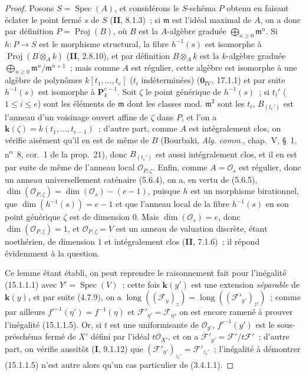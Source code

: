 \begin{proof}
Posons $S=\operatorname{Spec}(A)$, et considérons le $S$-schéma $P$ obtenu en
faisant éclater le point fermé $s$ de $S$ (\textbf{II}, 8.1.3)~; si $\mathfrak m$
est l'idéal maximal de $A$, on a donc par définition
$P=\operatorname{Proj}(B)$, où $B$ est la $A$-algèbre graduée
$\bigoplus_{n\geqslant0}\mathfrak m^n$. Si $h:P\to S$ est le morphisme
structural, la fibre $h^{-1}(s)$ est isomorphe à
$\operatorname{Proj}(B\otimes_A k)$ (\textbf{II}, 2.8.10), et par définition
$B\otimes_A k$ est la $k$-algèbre graduée
$\bigoplus_{n\geqslant0}\mathfrak m^n/\mathfrak m^{n+1}$~; mais comme $A$ est
régulier, cette algèbre est isomorphe à une algèbre de polynômes
$k[t_1,\ldots,t_e]$ ($t_i$ indéterminées) ($\mathbf{0}_{\mathrm{IV}}$, 17.1.1)
et par suite $h^{-1}(s)$ est isomorphe à $\mathbf P_k^{e-1}$. Soit $\zeta$ le
point générique de $h^{-1}(s)$~; si $t_i'$ ($1\leqslant i\leqslant e$) sont les
éléments de $\mathfrak m$ dont les classes mod. $\mathfrak m^2$ sont les $t_i$,
$B_{(t_e')}$ est l'anneau d'un voisinage ouvert affine de $\zeta$ dans $P$, et
l'on a $\mathbf{k}(\zeta)=k(t_1,\ldots,t_{e-1})$~; d'autre part, comme $A$ est
intégralement clos, on vérifie aisément qu'il en est de même de $B$ (Bourbaki,
\emph{Alg. comm.}, chap.~V, \S~1, n\textsuperscript{o}~8, cor.~1 de la prop.~21),
donc $B_{(t_e')}$ est aussi intégralement clos, et il en est par suite de même de
l'anneau local $\mathcal O_{P,\zeta}$. Enfin, comme $A=\mathcal O_s$ est
régulier, donc un anneau universellement caténaire (5.6.4), on a, en vertu de
(5.6.5),
$\dim(\mathcal O_{P,\zeta})=\dim(\mathcal O_s)-(e-1)$, puisque $h$ est un
morphisme birationnel, que $\dim(h^{-1}(s))=e-1$ et que l'anneau local de la
fibre $h^{-1}(s)$ en son point générique $\zeta$ est de dimension $0$. Mais
$\dim(\mathcal O_s)=e$, donc $\dim(\mathcal O_{P,\zeta})=1$, et
$\mathcal O_{P,\zeta}=V$ est un anneau de valuation discrète, étant noethérien,
de dimension $1$ et intégralement clos (\textbf{II}, 7.1.6)~; il répond
évidemment à la question.

Ce lemme étant établi, on peut reprendre le raisonnement fait pour l'inégalité
(15.1.1.1) avec $Y'=\operatorname{Spec}(V)$~; cette fois $\mathbf{k}(y')$ est
une extension \emph{séparable} de $\mathbf{k}(y)$, et par suite (4.7.9), on a
$\operatorname{long}((\mathcal F_y)_z)=
\operatorname{long}((\mathcal F'_{y'})_{z'})$~; comme par ailleurs
$f'^{-1}(\eta')=f^{-1}(\eta)$ et $\mathcal F'_{\eta'}=\mathcal F_\eta$, on est
encore ramené à prouver l'inégalité (15.1.1.5). Or, si $t$ est une uniformisante
de $\mathcal O_{y'}$, $f'^{-1}(y')$ est le sous-préschéma fermé de $X'$ défini
par l'idéal $t\mathcal O_{X'}$, et on a
$\mathcal F'_{y'}=\mathcal F'/t\mathcal F'$~; d'autre part, on vérifie aussitôt
(\textbf{I}, 9.1.12) que
$(\mathcal F'_{\eta'})_{z_i'}=\mathcal F'_{z_i'}$~; l'inégalité à démontrer
(15.1.1.5) n'est autre alors qu'un cas particulier de (3.4.1.1).
\end{proof}

